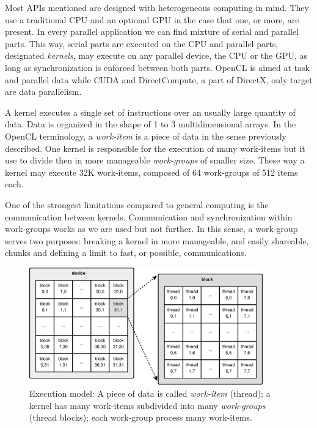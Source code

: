 \documentclass{article}
\begin{document}
Most APIs mentioned are designed with heterogeneous computing in
mind. They use a traditional CPU and an optional GPU in the case that
one, or more, are present. In every parallel application we can find
mixture of serial and parallel parts. This way, serial parts are
executed on the CPU and parallel parts, designated \textit{kernels},
may execute on any parallel device, the CPU or the GPU, as long as
synchronization is enforced between both parts. OpenCL is aimed at
task and parallel data while CUDA and DirectCompute, a part of
DirectX, only target are data parallelism. 

A kernel executes a single set of instructions over an usually large
quantity of data. Data is organized in the shape of 1 to 3
multidimensional arrays. In the OpenCL terminology, a
\textit{work-item} is a 
piece of data in the sense previously described. One kernel is
responsible for the execution of many work-items but it use to divide
then in more manageable \textit{work-groups} of smaller size. These
way a kernel may execute 32K work-items, composed of 64 work-groups of
512 items each. 

One of the strongest limitations compared to general computing is the
communication between kernels. Communication and synchronization
within work-groups works as we are used but not further. In this
sense, a work-group serves two purposes: breaking a kernel in more
manageable, and easily shareable, chunks and defining a limit to fast, or
possible, communications. 

\begin{figure}[!ht]
\centering
\includegraphics[width=0.9\textwidth]{grid.eps}
\caption{Execution model: A piece of data is called {\it work-item} (thread); a kernel has many work-items subdivided into many {\it work-groups} (thread blocks); each work-group process many work-items.}
\label{figure:grid}
\end{figure}
\end{document}
